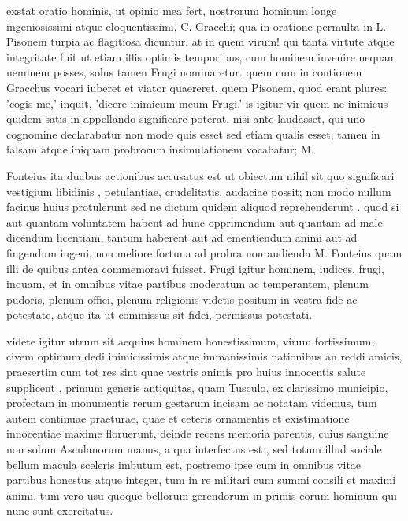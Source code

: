  exstat oratio hominis, ut opinio mea fert, nostrorum hominum longe ingeniosissimi atque eloquentissimi, C. Gracchi; qua in oratione permulta in L. Pisonem turpia ac flagitiosa dicuntur. at in quem virum! qui tanta virtute atque integritate fuit ut etiam illis optimis temporibus, cum hominem invenire nequam neminem posses, solus tamen Frugi nominaretur. quem cum in contionem Gracchus vocari iuberet et viator quaereret, quem Pisonem, quod erant plures: 'cogis me,' inquit, 'dicere inimicum meum Frugi.' is igitur vir quem ne inimicus quidem satis in appellando significare poterat, nisi ante laudasset, qui uno cognomine declarabatur non modo quis esset sed etiam qualis esset, tamen in falsam atque iniquam probrorum insimulationem vocabatur; M.

 Fonteius ita duabus actionibus accusatus est ut obiectum nihil sit quo significari vestigium libidinis , petulantiae, crudelitatis, audaciae possit; non modo nullum facinus huius protulerunt sed ne dictum quidem aliquod reprehenderunt . quod si aut quantam voluntatem habent ad hunc opprimendum aut quantam ad male dicendum licentiam, tantum haberent aut ad ementiendum animi aut ad fingendum ingeni, non meliore fortuna ad probra non audienda M. Fonteius quam illi de quibus antea commemoravi fuisset. Frugi igitur hominem, iudices, frugi, inquam, et in omnibus vitae partibus moderatum ac temperantem, plenum pudoris, plenum offici, plenum religionis videtis positum in vestra fide ac potestate, atque ita ut commissus sit fidei, permissus potestati.

 videte igitur utrum sit aequius hominem honestissimum, virum fortissimum, civem optimum dedi inimicissimis atque immanissimis nationibus an reddi amicis, praesertim cum tot res sint quae vestris animis pro huius innocentis salute supplicent , primum generis antiquitas, quam Tusculo, ex clarissimo municipio, profectam in monumentis rerum gestarum incisam ac notatam videmus, tum autem continuae praeturae, quae et ceteris ornamentis et existimatione innocentiae maxime floruerunt, deinde recens memoria parentis, cuius sanguine non solum Asculanorum manus, a qua interfectus est , sed totum illud sociale bellum macula sceleris imbutum est, postremo ipse cum in omnibus vitae partibus honestus atque integer, tum in re militari cum summi consili et maximi animi, tum vero usu quoque bellorum gerendorum in primis eorum hominum qui nunc sunt exercitatus.

